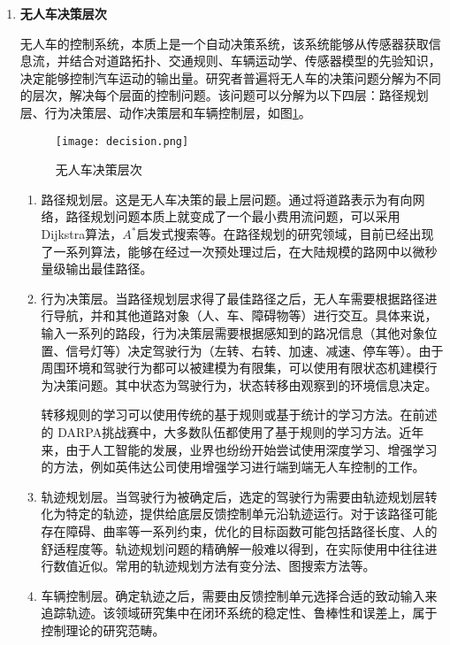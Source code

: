 \begin{enumerate}[wide=\parindent]
\item \textbf{无人车决策层次}
\label{sec:hierarchy}

无人车的控制系统，本质上是一个自动决策系统，该系统能够从传感器获取信息流，并结合对道路拓扑、交通规则、车辆运动学、传感器模型的先验知识，决定能够控制汽车运动的输出量。研究者普遍将无人车的决策问题分解为不同的层次，解决每个层面的控制问题。该问题可以分解为以下四层：路径规划层、行为决策层、动作决策层和车辆控制层\cite{paden2016survey}，如图\ref{fig:decision0}。

\begin{figure}[htbp]
\centering
\texttt{[image: decision.png]}
\caption{无人车决策层次\cite{paden2016survey}}
\label{fig:decision0}
\end{figure}
\begin{enumerate}[label=(\arabic*), wide=\parindent]
\item 路径规划层。这是无人车决策的最上层问题。通过将道路表示为有向网络，路径规划问题本质上就变成了一个最小费用流问题，可以采用 Dijkstra算法\cite{Dijkstra1959A}，$A^*$启发式搜索\cite{Nilsson1969A}等。在路径规划的研究领域，目前已经出现了一系列算法，能够在经过一次预处理过后，在大陆规模的路网中以微秒量级输出最佳路径\cite{Goldberg2003Computing,Geisberger2012Exact}。

\item 行为决策层。当路径规划层求得了最佳路径之后，无人车需要根据路径进行导航，并和其他道路对象（人、车、障碍物等）进行交互。具体来说，输入一系列的路段，行为决策层需要根据感知到的路况信息（其他对象位置、信号灯等）决定驾驶行为（左转、右转、加速、减速、停车等）。由于周围环境和驾驶行为都可以被建模为有限集，可以使用有限状态机建模行为决策问题。其中状态为驾驶行为，状态转移由观察到的环境信息决定。

转移规则的学习可以使用传统的基于规则或基于统计的学习方法。在前述的 DARPA挑战赛中，大多数队伍都使用了基于规则的学习方法\cite{Buehler2009The}。近年来，由于人工智能的发展，业界也纷纷开始尝试使用深度学习、增强学习的方法，例如英伟达公司使用增强学习进行端到端无人车控制的工作\cite{Bojarski2016End}。

\item 轨迹规划层。当驾驶行为被确定后，选定的驾驶行为需要由轨迹规划层转化为特定的轨迹，提供给底层反馈控制单元沿轨迹运行。对于该路径可能存在障碍、曲率等一系列约束，优化的目标函数可能包括路径长度、人的舒适程度等。轨迹规划问题的精确解一般难以得到，在实际使用中往往进行数值近似。常用的轨迹规划方法有变分法、图搜索方法等。

\item 车辆控制层。确定轨迹之后，需要由反馈控制单元选择合适的致动输入来追踪轨迹。该领域研究集中在闭环系统的稳定性、鲁棒性和误差上，属于控制理论的研究范畴。


\end{enumerate}
\end{enumerate}

